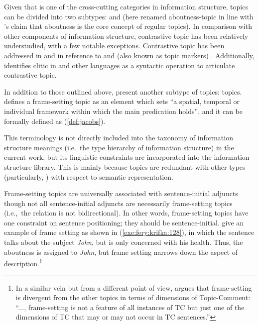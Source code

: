 Given that  is one of the cross-cutting categories in
information structure, topics can be divided into two subtypes:
 and  (here renamed
aboutness-topic in line with \citeauthor{choi:99}'s claim that
aboutness is the core concept of regular topics).  In comparison with
other components of information structure, contrastive topic has been
relatively understudied, with a few notable exceptions.  Contrastive
topic has been addressed in  and  in
reference to \wa and \nun (also known as topic markers)
\citep{kuno:73,choi:99}. Additionally, \citet{arregi:03} identifies
clitic  in  and other languages as
a syntactic operation to articulate contrastive topic.


In addition to those outlined above, \citet{fery:krifka:08} present
another subtype of topics:  topics.
\cite[50]{chafe:76} defines a frame-setting topic as an element
which sets ``a spatial, temporal or individual framework within which
the main predication holds'', and it can be formally defined as
(\ref{def:jacobs}).



\noindent This terminology is not directly included into the taxonomy
of information structure meanings (i.e.\ the type hierarchy of
information structure) in the current work, but its linguistic
constraints are incorporated into the information structure
library. This is mainly because  topics are
redundant with other  types (particularly, )
with respect to semantic representation.


Frame-setting topics are universally associated with
sentence-initial adjuncts \citep[118]{lambrecht:96} though not all
sentence-initial adjuncts are necessarily frame-setting topics
(i.e.,\ the relation is not bidirectional). In other
words, frame-setting topics have one constraint on sentence
positioning; they should be sentence-initial.  \citet{fery:krifka:08}
give an example of frame setting as shown in
(\ref{exe:fery:krifka:128}), in which the sentence talks about the
subject \textit{John}, but is only concerned with his health. Thus,
the aboutness  is assigned to \textit{John}, but frame setting
narrows down the aspect of description.\footnote{In a similar vein but
  from a different point of view, \citet[656]{jacobs:01} argues
  that frame-setting is divergent from the other topics in terms of
  dimensions of Topic-Comment: ``..., frame-setting is not a feature
  of all instances of TC but just one of the dimensions of TC that may
  or may not occur in TC sentences.''  }


